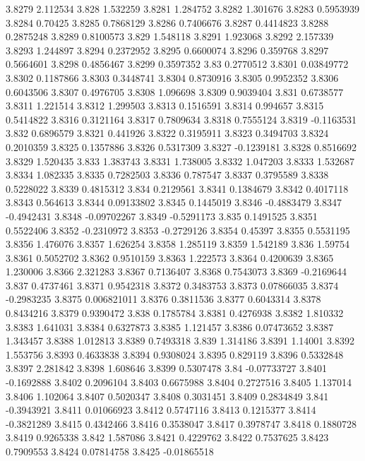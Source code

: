 3.8279  2.112534
3.828  1.532259
3.8281  1.284752
3.8282  1.301676
3.8283  0.5953939
3.8284  0.70425
3.8285  0.7868129
3.8286  0.7406676
3.8287  0.4414823
3.8288  0.2875248
3.8289  0.8100573
3.829  1.548118
3.8291  1.923068
3.8292  2.157339
3.8293  1.244897
3.8294  0.2372952
3.8295  0.6600074
3.8296  0.359768
3.8297  0.5664601
3.8298  0.4856467
3.8299  0.3597352
3.83  0.2770512
3.8301  0.03849772
3.8302  0.1187866
3.8303  0.3448741
3.8304  0.8730916
3.8305  0.9952352
3.8306  0.6043506
3.8307  0.4976705
3.8308  1.096698
3.8309  0.9039404
3.831  0.6738577
3.8311  1.221514
3.8312  1.299503
3.8313  0.1516591
3.8314  0.994657
3.8315  0.5414822
3.8316  0.3121164
3.8317  0.7809634
3.8318  0.7555124
3.8319  -0.1163531
3.832  0.6896579
3.8321  0.441926
3.8322  0.3195911
3.8323  0.3494703
3.8324  0.2010359
3.8325  0.1357886
3.8326  0.5317309
3.8327  -0.1239181
3.8328  0.8516692
3.8329  1.520435
3.833  1.383743
3.8331  1.738005
3.8332  1.047203
3.8333  1.532687
3.8334  1.082335
3.8335  0.7282503
3.8336  0.787547
3.8337  0.3795589
3.8338  0.5228022
3.8339  0.4815312
3.834  0.2129561
3.8341  0.1384679
3.8342  0.4017118
3.8343  0.564613
3.8344  0.09133802
3.8345  0.1445019
3.8346  -0.4883479
3.8347  -0.4942431
3.8348  -0.09702267
3.8349  -0.5291173
3.835  0.1491525
3.8351  0.5522406
3.8352  -0.2310972
3.8353  -0.2729126
3.8354  0.45397
3.8355  0.5531195
3.8356  1.476076
3.8357  1.626254
3.8358  1.285119
3.8359  1.542189
3.836  1.59754
3.8361  0.5052702
3.8362  0.9510159
3.8363  1.222573
3.8364  0.4200639
3.8365  1.230006
3.8366  2.321283
3.8367  0.7136407
3.8368  0.7543073
3.8369  -0.2169644
3.837  0.4737461
3.8371  0.9542318
3.8372  0.3483753
3.8373  0.07866035
3.8374  -0.2983235
3.8375  0.006821011
3.8376  0.3811536
3.8377  0.6043314
3.8378  0.8434216
3.8379  0.9390472
3.838  0.1785784
3.8381  0.4276938
3.8382  1.810332
3.8383  1.641031
3.8384  0.6327873
3.8385  1.121457
3.8386  0.07473652
3.8387  1.343457
3.8388  1.012813
3.8389  0.7493318
3.839  1.314186
3.8391  1.14001
3.8392  1.553756
3.8393  0.4633838
3.8394  0.9308024
3.8395  0.829119
3.8396  0.5332848
3.8397  2.281842
3.8398  1.608646
3.8399  0.5307478
3.84  -0.07733727
3.8401  -0.1692888
3.8402  0.2096104
3.8403  0.6675988
3.8404  0.2727516
3.8405  1.137014
3.8406  1.102064
3.8407  0.5020347
3.8408  0.3031451
3.8409  0.2834849
3.841  -0.3943921
3.8411  0.01066923
3.8412  0.5747116
3.8413  0.1215377
3.8414  -0.3821289
3.8415  0.4342466
3.8416  0.3538047
3.8417  0.3978747
3.8418  0.1880728
3.8419  0.9265338
3.842  1.587086
3.8421  0.4229762
3.8422  0.7537625
3.8423  0.7909553
3.8424  0.07814758
3.8425  -0.01865518
